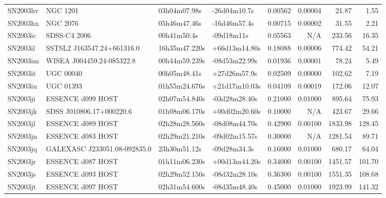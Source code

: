 \begin{longtable}{llllrrrr}
SN2003hv         &                        NGC 1201 &    03h04m07.98s &    -26d04m10.7s &  0.00562 &  0.00004 &    21.87 &        1.55 \\
SN2003hx         &                        NGC 2076 &    05h46m47.46s &    -16d46m57.4s &  0.00715 &  0.00002 &    31.55 &        2.21 \\
SN2003ic         &                    SDSS-C4 2006 &     00h41m50.4s &      -09d18m11s &  0.05563 &      N/A &   233.56 &       16.35 \\
SN2003il         &      SSTSL2 J163547.24+661316.0 &   16h35m47.220s &   +66d13m14.80s &  0.18088 &  0.00006 &   774.42 &       54.21 \\
SN2003im         &       WISEA J004459.24-085322.8 &   00h44m59.239s &   -08d53m22.99s &  0.01936 &  0.00001 &    78.24 &        5.49 \\
SN2003it         &                       UGC 00040 &    00h05m48.41s &    +27d26m57.9s &  0.02509 &  0.00000 &   102.62 &        7.19 \\
SN2003iu         &                       UGC 01393 &   01h55m24.676s &   +21d17m10.03s &  0.04109 &  0.00019 &   172.06 &       12.07 \\
SN2003ji         &               ESSENCE d099 HOST &   02h07m54.840s &   -03d28m28.40s &  0.21000 &  0.01000 &   895.64 &       75.93 \\
SN2003jk         &        SDSS J010806.17+000220.6 &   01h08m06.170s &   +00d02m20.60s &  0.10000 &      N/A &   423.67 &       29.66 \\
SN2003jl         &               ESSENCE d089 HOST &   02h28m28.560s &   -08d08m44.70s &  0.42900 &  0.00100 &  1833.98 &      128.45 \\
SN2003jn         &               ESSENCE d083 HOST &   02h29m21.210s &   -09d02m15.57s &  0.30000 &      N/A &  1281.54 &       89.71 \\
SN2003jq         &  GALEXASC J233051.08-092835.0   &    23h30m51.12s &    -09d28m34.3s &  0.16000 &  0.01000 &   680.17 &       64.04 \\
SN2003jr         &               ESSENCE d087 HOST &   01h11m06.230s &   +00d13m44.20s &  0.34000 &  0.00100 &  1451.57 &      101.70 \\
SN2003js         &               ESSENCE d093 HOST &   02h29m52.150s &   -08d32m28.10s &  0.36300 &  0.00100 &  1551.35 &      108.68 \\
SN2003jt         &               ESSENCE d097 HOST &   02h31m54.600s &   -08d35m48.40s &  0.45000 &  0.01000 &  1923.99 &      141.32 \\

\end{longtable}

